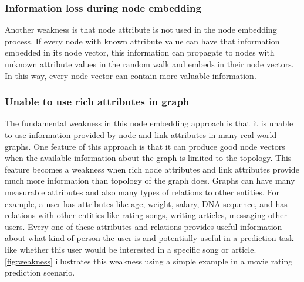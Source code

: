 \documentclass{article}
\begin{document}
\subsubsection{Information loss during node embedding}
Another weakness is that node attribute is not used in the node embedding process. If every node with known attribute value can have that information embedded in its node vector, this information can propagate to nodes with unknown attribute values in the random walk and embeds in their node vectors. In this way, every node vector can contain more valuable information.

\subsubsection{Unable to use rich attributes in graph}
The fundamental weakness in this node embedding approach is that it is unable to use information provided by node and link attributes in many real world graphs. One feature of this approach is that it can produce good node vectors when the available information about the graph is limited to the topology. This feature becomes a weakness when rich node attributes and link attributes provide much more information than topology of the graph does. Graphs can have many measurable attributes and also many types of relations to other entities. For example, a user has attributes like age, weight, salary, DNA sequence, and has relations with other entities like rating songs, writing articles, messaging other users. Every one of these attributes and relations provides useful information about what kind of person the user is and potentially useful in a prediction task like whether this user would be interested in a specific song or article. \autoref{fig:weakness} illustrates this weakness using a simple example in a movie rating prediction scenario.
\end{document}
